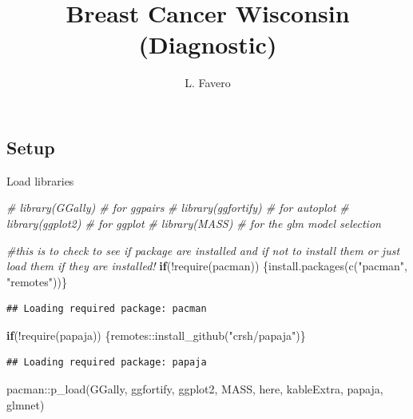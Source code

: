 \documentclass[
  11pt,
]{article}
\title{Breast Cancer Wisconsin (Diagnostic)}
\author{L. Favero}
\date{}
\newenvironment{Shaded}{\begin{snugshade}}{\end{snugshade}}
\newcommand{\CommentTok}[1]{\textcolor[rgb]{0.56,0.35,0.01}{\textit{#1}}}
\newcommand{\ControlFlowTok}[1]{\textcolor[rgb]{0.13,0.29,0.53}{\textbf{#1}}}
\newcommand{\FunctionTok}[1]{\textcolor[rgb]{0.00,0.00,0.00}{#1}}
\newcommand{\NormalTok}[1]{#1}
\newcommand{\SpecialCharTok}[1]{\textcolor[rgb]{0.00,0.00,0.00}{#1}}
\newcommand{\StringTok}[1]{\textcolor[rgb]{0.31,0.60,0.02}{#1}}
\begin{document}
\maketitle

{
\hypersetup{linkcolor=}
\setcounter{tocdepth}{1}
\tableofcontents
}
\hypertarget{setup}{%
\subsection{Setup}\label{setup}}

Load libraries

\begin{Shaded}
\begin{Highlighting}[]
\CommentTok{\# library(GGally)       \# for ggpairs}
\CommentTok{\# library(ggfortify)    \# for autoplot}
\CommentTok{\# library(ggplot2)      \# for ggplot}
\CommentTok{\# library(\textquotesingle{}MASS\textquotesingle{})       \# for the glm model selection }

\CommentTok{\#this is to check to see if package are installed and if not to install them or just load them if they are installed!}
\ControlFlowTok{if}\NormalTok{(}\SpecialCharTok{!}\FunctionTok{require}\NormalTok{(pacman)) \{}\FunctionTok{install.packages}\NormalTok{(}\FunctionTok{c}\NormalTok{(}\StringTok{"pacman"}\NormalTok{, }\StringTok{"remotes"}\NormalTok{))\}}
\end{Highlighting}
\end{Shaded}

\begin{verbatim}
## Loading required package: pacman
\end{verbatim}

\begin{Shaded}
\begin{Highlighting}[]
\ControlFlowTok{if}\NormalTok{(}\SpecialCharTok{!}\FunctionTok{require}\NormalTok{(papaja)) \{remotes}\SpecialCharTok{::}\FunctionTok{install\_github}\NormalTok{(}\StringTok{"crsh/papaja"}\NormalTok{)\}}
\end{Highlighting}
\end{Shaded}

\begin{verbatim}
## Loading required package: papaja
\end{verbatim}

\begin{Shaded}
\begin{Highlighting}[]
\NormalTok{pacman}\SpecialCharTok{::}\FunctionTok{p\_load}\NormalTok{(GGally, ggfortify, ggplot2, MASS, here, kableExtra, papaja, glmnet)}
\end{Highlighting}
\end{Shaded}
\end{document}
